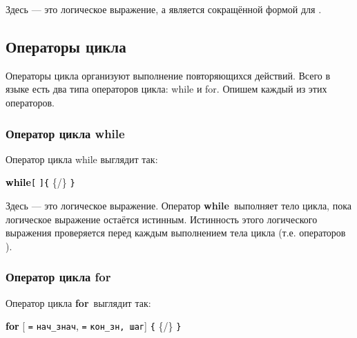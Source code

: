 \documentclass[10pt]{report}
\begin{document}
Здесь \textcolor{Green}{} --- это логическое выражение, а
\textcolor{Green}{} является сокращённой формой для
\textcolor{Green}{}.


    \subsection{Операторы цикла}
Операторы цикла организуют выполнение повторяющихся действий. Всего в языке есть два типа операторов цикла: while и for. Опишем каждый из этих операторов.


        \subsubsection{Оператор цикла while}
Оператор цикла while выглядит так:
\begin{center}
\textcolor{Black}{\textbf{while}}\textcolor{Black}{\texttt{[}}%
\textcolor{Black}{\texttt{]}}\textcolor{Black}{\texttt{\{}} \{/\} \textcolor{Black}{\texttt{\} }}
\end{center}
Здесь \textcolor{Green}{} --- это логическое выражение.
Оператор \textbf{\glqq while\grqq}\ выполняет тело цикла, пока логическое выражение
\textcolor{Green}{} остаётся истинным. Истинность этого логического выражения проверяется перед каждым выполнением тела цикла (т.е.
операторов \textcolor{Green}{}).
    

        \subsubsection{Оператор цикла for}
Оператор цикла \textbf{for}\ выглядит так:
\begin{center}
\textcolor{Black}{\textbf{for}}%
[ \textcolor{Black}{\texttt{=}} \textcolor{Black}{\texttt{нач_знач},  \textcolor{Black}{\texttt{=}} }\textcolor{Black}{\texttt{кон_зн}}\textcolor{Black}{\texttt{, шаг}}]%
\textcolor{Black}{\texttt{\{}} \{/\} \textcolor{Black}{\texttt{\} }}
\end{center}
\end{document}
